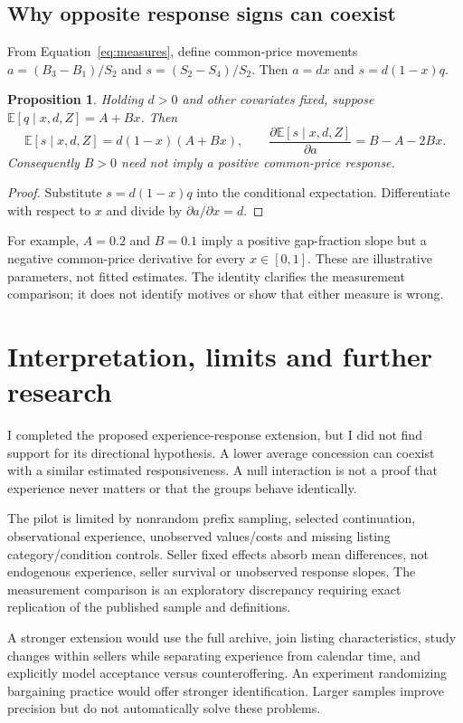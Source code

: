 \documentclass[11pt,a4paper]{article}
\newtheorem{proposition}{Proposition}
\begin{document}
\subsection{Why opposite response signs can coexist}
From Equation~\ref{eq:measures}, define common-price movements
$a=(B_3-B_1)/S_2$ and $s=(S_2-S_4)/S_2$. Then $a=dx$ and $s=d(1-x)q$.
\begin{proposition}
Holding $d>0$ and other covariates fixed, suppose
$\mathbb{E}[q\mid x,d,Z]=A+Bx$. Then
\[
\mathbb{E}[s\mid x,d,Z]=d(1-x)(A+Bx),\qquad
\frac{\partial\mathbb{E}[s\mid x,d,Z]}{\partial a}=B-A-2Bx.
\]
Consequently $B>0$ need not imply a positive common-price response.
\end{proposition}
\begin{proof}
Substitute $s=d(1-x)q$ into the conditional expectation. Differentiate with
respect to $x$ and divide by $\partial a/\partial x=d$.
\end{proof}
For example, $A=0.2$ and $B=0.1$ imply a positive gap-fraction slope but a
negative common-price derivative for every $x\in[0,1]$. These are illustrative
parameters, not fitted estimates. The identity clarifies the measurement
comparison; it does not identify motives or show that either measure is wrong.

\section{Interpretation, limits and further research}
I completed the proposed experience-response extension, but I did not find
support for its directional hypothesis. A lower average concession can coexist with a
similar estimated responsiveness. A null interaction is not a proof that
experience never matters or that the groups behave identically.

The pilot is limited by nonrandom prefix sampling, selected continuation,
observational experience, unobserved values/costs and missing listing
category/condition controls. Seller fixed effects absorb mean differences,
not endogenous experience, seller survival or unobserved response slopes.
The measurement comparison is an exploratory discrepancy requiring exact
replication of the published sample and definitions.

A stronger extension would use the full archive, join listing characteristics,
study changes within sellers while separating experience from calendar time,
and explicitly model acceptance versus counteroffering. An experiment
randomizing bargaining practice would offer stronger identification. Larger
samples improve precision but do not automatically solve these problems.
\end{document}
